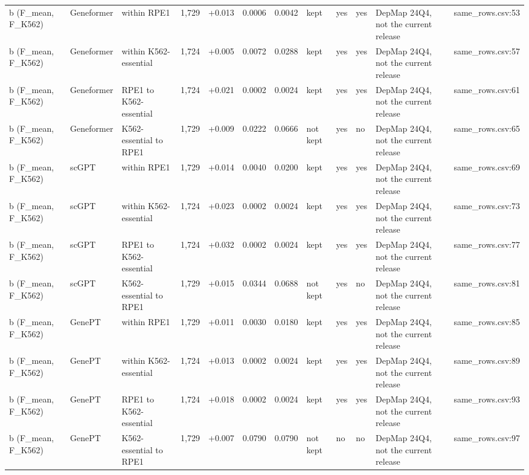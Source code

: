 \begin{tabular}{lllrrrrllll}
b (F\_mean, F\_K562) & Geneformer & within RPE1 & 1,729 & +0.013 & 0.0006 & 0.0042 & kept & yes & yes & DepMap 24Q4, not the current release & same\_rows.csv:53 \\
b (F\_mean, F\_K562) & Geneformer & within K562-essential & 1,724 & +0.005 & 0.0072 & 0.0288 & kept & yes & yes & DepMap 24Q4, not the current release & same\_rows.csv:57 \\
b (F\_mean, F\_K562) & Geneformer & RPE1 to K562-essential & 1,724 & +0.021 & 0.0002 & 0.0024 & kept & yes & yes & DepMap 24Q4, not the current release & same\_rows.csv:61 \\
b (F\_mean, F\_K562) & Geneformer & K562-essential to RPE1 & 1,729 & +0.009 & 0.0222 & 0.0666 & not kept & yes & no & DepMap 24Q4, not the current release & same\_rows.csv:65 \\
b (F\_mean, F\_K562) & scGPT & within RPE1 & 1,729 & +0.014 & 0.0040 & 0.0200 & kept & yes & yes & DepMap 24Q4, not the current release & same\_rows.csv:69 \\
b (F\_mean, F\_K562) & scGPT & within K562-essential & 1,724 & +0.023 & 0.0002 & 0.0024 & kept & yes & yes & DepMap 24Q4, not the current release & same\_rows.csv:73 \\
b (F\_mean, F\_K562) & scGPT & RPE1 to K562-essential & 1,724 & +0.032 & 0.0002 & 0.0024 & kept & yes & yes & DepMap 24Q4, not the current release & same\_rows.csv:77 \\
b (F\_mean, F\_K562) & scGPT & K562-essential to RPE1 & 1,729 & +0.015 & 0.0344 & 0.0688 & not kept & yes & no & DepMap 24Q4, not the current release & same\_rows.csv:81 \\
b (F\_mean, F\_K562) & GenePT & within RPE1 & 1,729 & +0.011 & 0.0030 & 0.0180 & kept & yes & yes & DepMap 24Q4, not the current release & same\_rows.csv:85 \\
b (F\_mean, F\_K562) & GenePT & within K562-essential & 1,724 & +0.013 & 0.0002 & 0.0024 & kept & yes & yes & DepMap 24Q4, not the current release & same\_rows.csv:89 \\
b (F\_mean, F\_K562) & GenePT & RPE1 to K562-essential & 1,724 & +0.018 & 0.0002 & 0.0024 & kept & yes & yes & DepMap 24Q4, not the current release & same\_rows.csv:93 \\
b (F\_mean, F\_K562) & GenePT & K562-essential to RPE1 & 1,729 & +0.007 & 0.0790 & 0.0790 & not kept & no & no & DepMap 24Q4, not the current release & same\_rows.csv:97 \\
\bottomrule
\end{tabular}
